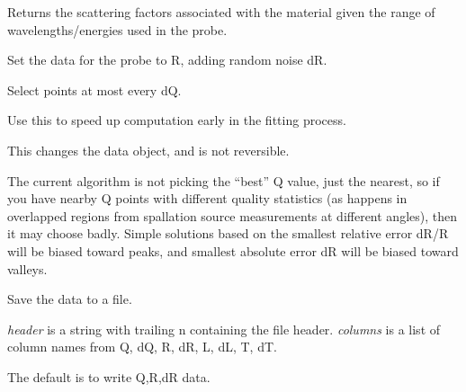 \documentclass[letterpaper,10pt,english]{sphinxmanual}
\begin{document}
\begin{fulllineitems}

\begin{fulllineitems}
\label{api/probe:refl1d.probe.NeutronProbe.scattering_factors}
Returns the scattering factors associated with the material given
the range of wavelengths/energies used in the probe.

\end{fulllineitems}


\begin{fulllineitems}
\label{api/probe:refl1d.probe.NeutronProbe.simulate_data}
Set the data for the probe to R, adding random noise dR.

\end{fulllineitems}


\begin{fulllineitems}
\label{api/probe:refl1d.probe.NeutronProbe.subsample}
Select points at most every dQ.

Use this to speed up computation early in the fitting process.

This changes the data object, and is not reversible.

The current algorithm is not picking the ``best'' Q value, just the
nearest, so if you have nearby Q points with different quality
statistics (as happens in overlapped regions from spallation
source measurements at different angles), then it may choose
badly.  Simple solutions based on the smallest relative error dR/R
will be biased toward peaks, and smallest absolute error dR will
be biased toward valleys.

\end{fulllineitems}


\begin{fulllineitems}
\label{api/probe:refl1d.probe.NeutronProbe.write_data}
Save the data to a file.

\emph{header} is a string with trailing n containing the file header.
\emph{columns} is a list of column names from Q, dQ, R, dR, L, dL, T, dT.

The default is to write Q,R,dR data.

\end{fulllineitems}


\end{fulllineitems}
\end{document}
